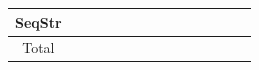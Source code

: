 \begin{table}[t]
{\begin{tabular}{c|c|ccc|ccc|ccc|ccc}
      SeqStr            & \EXPtodo{--}      & \EXPtodo{--}                       & \EXPtodo{--}                        & \EXPtodo{--}                         & \EXPtodo{--}                          & \EXPtodo{--} & \EXPtodo{--} & \EXPtodo{--} & \EXPtodo{--} & \EXPtodo{--} & \EXPtodo{--} & \EXPtodo{--} & \EXPtodo{--} \\
      \midrule
      \rowcolor{gray!20}
      Total             & \EXPtodo{--}      & \EXPtodo{--}                       & \EXPtodo{--}                        & \EXPtodo{--}                         & \EXPtodo{--}                          & \EXPtodo{--} & \EXPtodo{--} & \EXPtodo{--} & \EXPtodo{--} & \EXPtodo{--} & \EXPtodo{--} & \EXPtodo{--} & \EXPtodo{--} \\
      \bottomrule
    \end{tabular}%
  }
\end{table}


